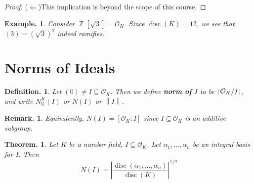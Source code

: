 \documentclass[11pt, a4paper]{memoir}
\DeclareMathOperator{\Q}{{\mathbb{Q}}}
\DeclareMathOperator{\Z}{{\mathbb{Z}}}
\newcommand{\impl}{{($\Leftarrow$)\hspace{0.2cm}}}
\newcommand{\norm}[1]{\ensuremath{\left\lVert#1\right\rVert}}
\theoremstyle{change}
\newtheorem{theorem}{Theorem.}[section]
\theoremstyle{plain}
\theoremstyle{nonumberplain}
\newtheorem{definition}{Definition.}
\newtheorem{example}{Example.}
\newtheorem{remark}{Remark.}
\newtheorem{proof}{Proof}
\DeclareMathOperator{\disc}{disc}
\newcommand{\quot}[2]{\mathchoice{\left.\raisebox{0.13em}{$#1$}\middle/\raisebox{-0.13em}{$#2$}\right.}
                                 {\left.\raisebox{0.07em}{$#1$}\middle/\raisebox{-0.07em}{$#2$}\right.}
                                 {\left.\raisebox{0.03em}{$#1$}\middle/\raisebox{-0.03em}{$#2$}\right.}
                                 {\left.\raisebox{0em}{$#1$}\middle/\raisebox{0em}{$#2$}\right.}}
\newcommand{\mbf}[1]{{\boldmath\bfseries #1}}
\numberwithin{equation}{section}
\begin{document}
\begin{proof}
    \impl This implication is beyond the scope of this course.
\end{proof}
\begin{example}
    Consider $\Z[\sqrt{3}]=\mathcal{O}_K$.
    Since $\disc(K)=12$, we see that $(3)=(\sqrt{3})^2$ indeed ramifies.
\end{example}

\section{Norms of Ideals}
\begin{definition}
    Let $(0)\neq I\subseteq\mathcal{O}_K$.
    Then we define \mbf{norm of $I$} to be $\left\lvert\quot{\mathcal{O}_K}{I}\right\rvert$, and write $N_{\Q}^K(I)$ or $N(I)$ or $\norm{I}$.
\end{definition}
\begin{remark}
    Equivalently, $N(I)=[\mathcal{O}_K:I]$ since $I\subseteq\mathcal{O}_K$ is an additive subgroup.
\end{remark}
\begin{theorem}
    Let $K$ be a number field, $I\subseteq\mathcal{O}_K$.
    Let $\alpha_1,\ldots,\alpha_n$ be an integral basis for $I$.
    Then
    \begin{equation*}
        N(I)=\left\lvert\frac{\disc(\alpha_1,\ldots,\alpha_n)}{\disc(K)}\right\rvert^{1/2}
    \end{equation*}
\end{theorem}
\end{document}
